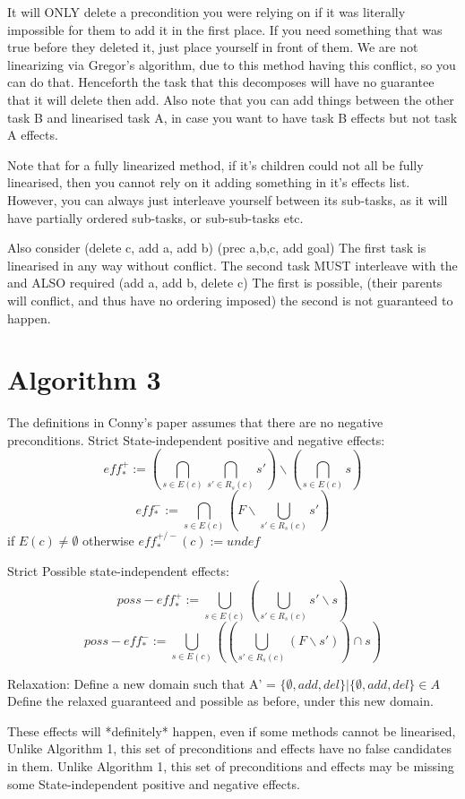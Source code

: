 It will ONLY delete a precondition you were relying on if it was literally impossible for them to add it in the first place.
If you need something that was true before they deleted it, just place yourself in front of them. We are not linearizing via Gregor's algorithm, due to this method having this conflict, so you can do that. Henceforth the task that this decomposes will have no guarantee that it will delete then add.
Also note that you can add things between the other task B and linearised task A, in case you want to have task B effects but not task A effects.


Note that for a fully linearized method, if it's children could not all be fully linearised,
then you cannot rely on it adding something in it's effects list. However, you can always just interleave yourself between its sub-tasks, as it will have partially ordered sub-tasks, or sub-sub-tasks etc.


Also consider (delete c, add a, add b) (prec a,b,c,  add goal)
The first task is linearised in any way without conflict.
The second task MUST interleave with the and ALSO required (add a, add b, delete c)
The first is possible, (their parents will conflict, and thus have no ordering imposed) the second is not guaranteed to happen.

\section{Algorithm 3}
The definitions in Conny's paper assumes that there are no negative preconditions.
Strict State-independent positive and negative effects:
 $$ eff^{+}_{*} := (\bigcap_{s \in E(c)} \bigcap_{s' \in R_s(c)} s')  \backslash  (\bigcap_{s \in E(c)} s)  $$
 $$ eff^{-}_{*} := \bigcap_{s \in E(c)} (F \backslash \bigcup_{s' \in R_s(c)}  s') $$
if $E(c) \neq \emptyset$ otherwise $eff^{+/-}_{*}(c) := undef$

Strict Possible state-independent effects:
 $$ poss-eff^{+}_{*} := \bigcup_{s \in E(c)} (\bigcup_{s' \in R_s(c)} s'\backslash s)   $$
 $$ poss-eff^{-}_{*} := \bigcup_{s \in E(c)} ((\bigcup_{s' \in R_s(c)} ( F \backslash s'))  \cap  s) $$

Relaxation: Define a new domain such that A' = ${ \{\emptyset, add, del \} |  \{\emptyset, add, del \} \in A }$
Define the relaxed guaranteed and possible as before, under this new domain.

These effects will *definitely* happen, even if some methods cannot be linearised,
Unlike Algorithm 1, this set of preconditions and effects have no false candidates in them.
Unlike Algorithm 1, this set of preconditions and effects may be missing some State-independent positive and negative effects.


